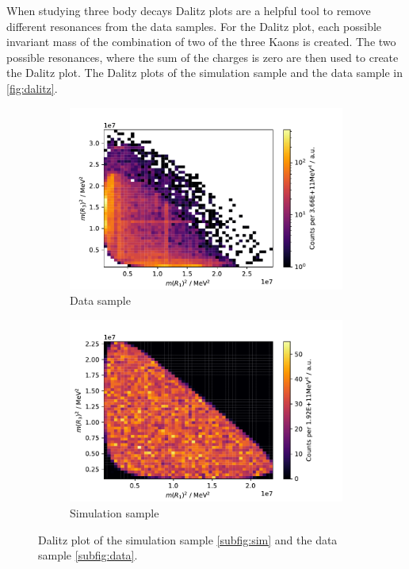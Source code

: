 When studying three body decays Dalitz plots are a helpful tool to remove different 
resonances from the data samples. For the Dalitz plot, each possible invariant mass 
of the combination of two of the three Kaons is created. The two possible resonances, 
where the sum of the charges is zero are then used to create the Dalitz plot. 
The Dalitz plots of the simulation sample and the data sample in \autoref{fig:dalitz}.


\begin{figure}[H]
	\centering
	\begin{subfigure}{0.45\textwidth}
		\includegraphics[width=\textwidth]{content/pictures/image_fin/DalitzDataHist.pdf}
		\caption{Data sample}
		\label{subfig:data}
	\end{subfigure}
	\begin{subfigure}{0.45\textwidth}
		\includegraphics[width=\textwidth]{content/pictures/image_fin/DalitzSimHist.pdf}
		\caption{Simulation sample}
		\label{subfig:sim}
	\end{subfigure} 
	\caption{Dalitz plot of the simulation sample \eqref{subfig:sim} and the data sample \eqref{subfig:data}.}
	\label{fig:dalitz}
\end{figure}

